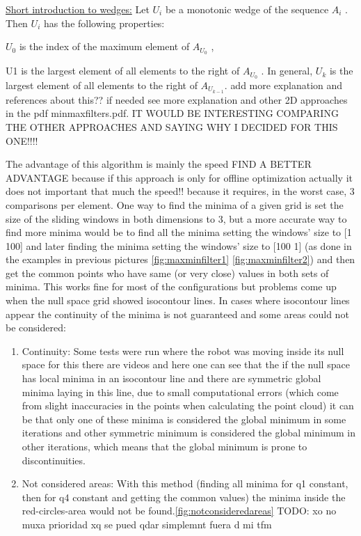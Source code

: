 \underline{Short introduction to wedges:} Let \textbf{$U_i$}  be a monotonic wedge of the sequence \textbf{$A_i$} . Then \textbf{$U_i$}  has the following
properties:

\textbf{$U_0$} is the index of the maximum element of \textbf{$A_{U_0}$} ,

U1  is the largest element of all elements to the right of \textbf{$A_{U_0}$} .
In general, \textbf{$U_k$}  is the largest element of all elements to the right of \textbf{$A_{U_{k-1}}$}.
{\color{red} add more explanation and references about this?? if needed see more explanation and other 2D approaches in the pdf minmaxfilters.pdf. IT WOULD BE INTERESTING COMPARING THE OTHER APPROACHES AND SAYING WHY I DECIDED FOR THIS ONE!!!!}

The advantage of this algorithm is mainly the speed {\color{red} FIND A BETTER ADVANTAGE because if this approach is only for offline optimization actually it does not important that much the speed!! }  because it requires, in the worst case, 3 comparisons per element. One way to find the minima of a given grid is set the size of the sliding windows in both dimensions to 3, but a more accurate way to find more minima would be to find all the minima setting the windows' size to [1 100] and later finding the minima setting the windows' size to [100 1] (as done in the examples in previous pictures \ref{fig:maxminfilter1} \ref{fig:maxminfilter2}) and then get the common points who have same (or very close) values in both sets of minima. This works fine for most of the configurations but problems come up when the null space grid showed isocontour lines. In cases where isocontour lines appear the continuity of the minima is not guaranteed and some areas could not be considered:

\begin{enumerate}
	\item Continuity: Some tests were run where the robot was moving inside its null space {\color{red}for this there are videos} and here one can see that the if the null space has local minima in an isocontour line and there are symmetric global minima laying in this line, due to small computational errors (which come from slight inaccuracies in the points when calculating the point cloud) it can be that only one of these minima is considered the global minimum in some iterations and other symmetric minimum is considered the global minimum in other iterations, which means that the global minimum is prone to discontinuities.
	\item Not considered areas: With this method (finding all minima for q1 constant, then for q4 constant and getting the common values) the minima inside the red-circles-area would not be found.\ref{fig:notconsideredareas}  {\color{red}TODO: xo no muxa prioridad xq se pued qdar simplemnt fuera d mi tfm}
\end{enumerate}

